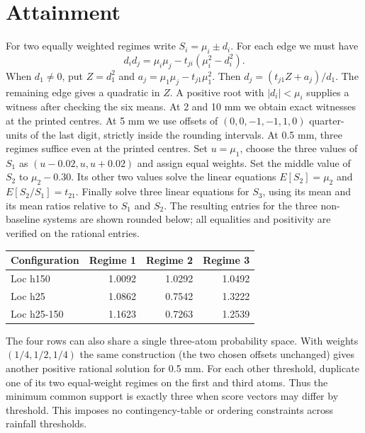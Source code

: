 \documentclass[11pt]{article}
\begin{document}
\section{Attainment}
For two equally weighted regimes write $S_i=\mu_i\pm d_i$. For each edge we must have
\[
 d_i d_j=\mu_i\mu_j-t_{ji}(\mu_i^2-d_i^2).
\]
When $d_1\ne0$, put $Z=d_1^2$ and $a_j=\mu_1\mu_j-t_{j1}\mu_1^2$. Then $d_j=(t_{j1}Z+a_j)/d_1$. The remaining edge gives a quadratic in $Z$. A positive root with $|d_i|<\mu_i$ supplies a witness after checking the six means. At 2 and 10 mm we obtain exact witnesses at the printed centres. At 5 mm we use offsets of $(0,0,-1,-1,1,0)$ quarter-units of the last digit, strictly inside the rounding intervals.
\newpage
At 0.5 mm, three regimes suffice even at the printed centres. Set $u=\mu_1$, choose the three values of $S_1$ as $(u-0.02,u,u+0.02)$ and assign equal weights. Set the middle value of $S_2$ to $\mu_2-0.30$. Its other two values solve the linear equations $E[S_2]=\mu_2$ and $E[S_2/S_1]=t_{21}$. Finally solve three linear equations for $S_3$, using its mean and its mean ratios relative to $S_1$ and $S_2$. The resulting entries for the three non-baseline systems are shown rounded below; all equalities and positivity are verified on the rational entries.
\begin{center}\small
\begin{tabular}{lrrr}\toprule
Configuration & Regime 1 & Regime 2 & Regime 3\\\midrule
Loc h150 &1.0092&1.0292&1.0492\\
Loc h25 &1.0862&0.7542&1.3222\\
Loc h25-150 &1.1623&0.7263&1.2539\\\bottomrule
\end{tabular}
\end{center}
The four rows can also share a single three-atom probability space. With weights $(1/4,1/2,1/4)$ the same construction (the two chosen offsets unchanged) gives another positive rational solution for 0.5 mm. For each other threshold, duplicate one of its two equal-weight regimes on the first and third atoms. Thus the minimum common support is exactly three when score vectors may differ by threshold. This imposes no contingency-table or ordering constraints across rainfall thresholds.
\end{document}
